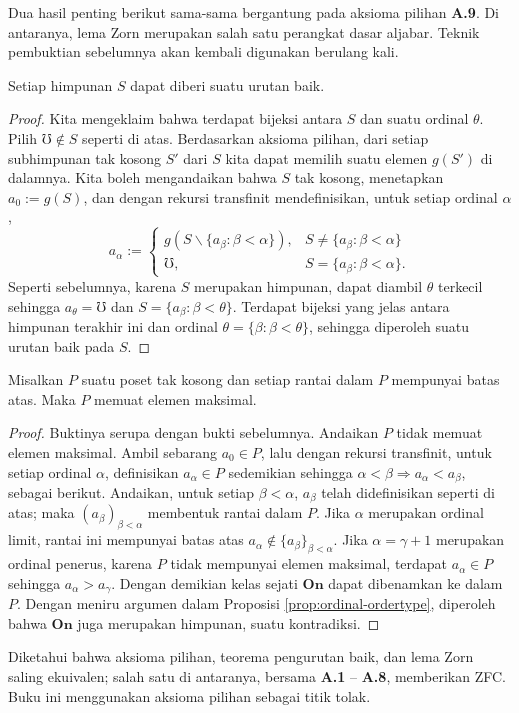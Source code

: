 Dua hasil penting berikut sama-sama bergantung pada aksioma pilihan \textbf{A.9}. Di antaranya, lema Zorn merupakan salah satu perangkat dasar aljabar. Teknik pembuktian sebelumnya akan kembali digunakan berulang kali.
\begin{theorem}\label{prop:wellorder-principle}
	Setiap himpunan $S$ dapat diberi suatu urutan baik.
\end{theorem}
\begin{proof}
	Kita mengeklaim bahwa terdapat bijeksi antara $S$ dan suatu ordinal $\theta$. Pilih $\mho \notin S$ seperti di atas. Berdasarkan aksioma pilihan, dari setiap subhimpunan tak kosong $S'$ dari $S$ kita dapat memilih suatu elemen $g(S')$ di dalamnya. Kita boleh mengandaikan bahwa $S$ tak kosong, menetapkan $a_0 := g(S)$, dan dengan rekursi transfinit mendefinisikan, untuk setiap ordinal $\alpha$,
	\[ a_\alpha := \begin{cases}
		g \left( S \smallsetminus \{ a_\beta : \beta < \alpha \} \right), & S \neq \{ a_\beta : \beta < \alpha \} \\
		\mho, & S = \{ a_\beta : \beta < \alpha \}.
	\end{cases}\]
	Seperti sebelumnya, karena $S$ merupakan himpunan, dapat diambil $\theta$ terkecil sehingga $a_\theta = \mho$ dan $S = \{a_\beta: \beta < \theta\}$. Terdapat bijeksi yang jelas antara himpunan terakhir ini dan ordinal $\theta = \{\beta : \beta < \theta \}$, sehingga diperoleh suatu urutan baik pada $S$.
\end{proof}

\begin{theorem}\label{prop:Zorn}
	Misalkan $P$ suatu poset tak kosong dan setiap rantai dalam $P$ mempunyai batas atas. Maka $P$ memuat elemen maksimal.
\end{theorem}
\begin{proof}
	Buktinya serupa dengan bukti sebelumnya. Andaikan $P$ tidak memuat elemen maksimal. Ambil sebarang $a_0 \in P$, lalu dengan rekursi transfinit, untuk setiap ordinal $\alpha$, definisikan $a_\alpha \in P$ sedemikian sehingga $\alpha < \beta \Rightarrow a_\alpha < a_\beta$, sebagai berikut. Andaikan, untuk setiap $\beta < \alpha$, $a_\beta$ telah didefinisikan seperti di atas; maka $(a_\beta)_{\beta < \alpha}$ membentuk rantai dalam $P$. Jika $\alpha$ merupakan ordinal limit, rantai ini mempunyai batas atas $a_\alpha \notin \{ a_\beta \}_{\beta < \alpha}$. Jika $\alpha = \gamma + 1$ merupakan ordinal penerus, karena $P$ tidak mempunyai elemen maksimal, terdapat $a_\alpha \in P$ sehingga $a_\alpha > a_\gamma$. Dengan demikian kelas sejati $\textbf{On}$ dapat dibenamkan ke dalam $P$. Dengan meniru argumen dalam Proposisi \ref{prop:ordinal-ordertype}, diperoleh bahwa $\textbf{On}$ juga merupakan himpunan, suatu kontradiksi.
\end{proof}
Diketahui bahwa aksioma pilihan, teorema pengurutan baik, dan lema Zorn saling ekuivalen; salah satu di antaranya, bersama \textbf{A.1} -- \textbf{A.8}, memberikan ZFC. Buku ini menggunakan aksioma pilihan sebagai titik tolak.

